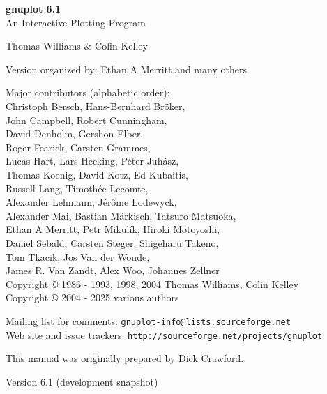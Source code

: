 \documentclass[11pt,twoside]{article}
\def\gpVersion{6.1}
\def\gnuplotVersion{\usebox\GpVersion}
\begin{document}
\sloppy
\thispagestyle{empty}
\rule{0in}{1.0in}

  \begin{center}

  {\huge\bf {gnuplot \gpVersion}}\\
  \vspace{3ex}
  {\Large An Interactive Plotting Program}\\

  \vspace{2ex}

  \large
  Thomas Williams \& Colin Kelley\\

  \vspace{2ex}

  Version
    {\gnuplotVersion }
  organized by: Ethan A Merritt and many others\\

   \vspace{2ex}

  Major contributors (alphabetic order):\\

  Christoph Bersch,
  Hans-Bernhard Bröker,\\
  John Campbell,
  Robert Cunningham,\\
  David Denholm,
  Gershon Elber,\\
  Roger Fearick,
  Carsten Grammes,\\
  Lucas Hart,
  Lars Hecking,
  Péter Juhász,\\
  Thomas Koenig,
  David Kotz,
  Ed Kubaitis,\\
  Russell Lang,
  Timothée Lecomte,\\
  Alexander Lehmann,
  Jérôme Lodewyck,\\
  Alexander Mai,
  Bastian Märkisch,
  Tatsuro Matsuoka, \\
  Ethan A Merritt,
  Petr Mikulík,
  Hiroki Motoyoshi, \\
  Daniel Sebald,
  Carsten Steger,
  Shigeharu Takeno,\\
  Tom Tkacik,
  Jos Van der Woude,\\
  James R. Van Zandt,
  Alex Woo,
  Johannes Zellner\\
  Copyright {\copyright} 1986 - 1993, 1998, 2004   Thomas Williams, Colin Kelley\\
  Copyright {\copyright} 2004 - 2025  various authors\\

  \vspace{2ex}

  Mailing list for comments: \verb+gnuplot-info@lists.sourceforge.net+\\
  Web site and issue trackers: \verb+http://sourceforge.net/projects/gnuplot+

  \vfill
  This manual was originally prepared by Dick Crawford. \\

  \vspace{2ex}

   Version {\gpVersion} (development snapshot)

   \end{center}
\newpage


\hypertarget{TableOfContents}{}
\tableofcontents

\newpage
\end{document}
